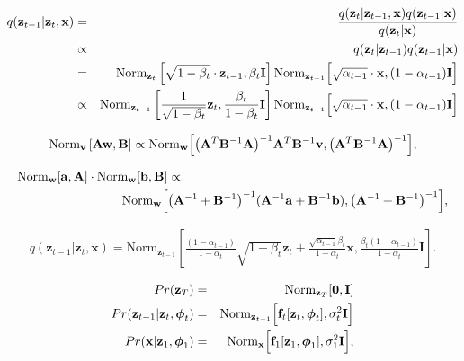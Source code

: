 \documentclass[letterpaper,twoside,openany, titlepage,oldfontcommands,titles,dvipsnames]{memoir}
\begin{document}
\begin{eqnarray}\label{eq:diffusion_bayes}
 q(\mathbf{z}_{t-1}|\mathbf{z}_{t},\mathbf{x}) & = & \frac{q(\mathbf{z}_{t}|\mathbf{z}_{t-1},\mathbf{x})q(\mathbf{z}_{t-1}|\mathbf{x})}{q(\mathbf{z}_{t}|\mathbf{x})} \\
 &\propto& q(\mathbf{z}_{t}|\mathbf{z}_{t-1})q(\mathbf{z}_{t-1}|\mathbf{x})\nonumber \\
 &=& \mbox{Norm}_{\mathbf{z}_{t}}\left[\sqrt{1-\beta_{t}}\cdot\mathbf{z}_{t-1},\beta_{t}\mathbf{I}\right]\mbox{Norm}_{\mathbf{z}_{t-1}}\Bigl[\sqrt{\alpha_{t-1}}\cdot\mathbf{x},(1-\alpha_{t-1})\mathbf{I}\Bigr]\nonumber \\
 &\propto& \mbox{Norm}_{\mathbf{z}_{t-1}}\left[\frac{1}{\sqrt{1-\beta_{t}}}\mathbf{z}_{t},\frac{\beta_{t}}{1-\beta_{t}}\mathbf{I}\right]\mbox{Norm}_{\mathbf{z}_{t-1}}\Bigl[\sqrt{\alpha_{t-1}}\cdot\mathbf{x},(1-\alpha_{t-1})\mathbf{I}\Bigr] \nonumber 
 \end{eqnarray}


\begin{eqnarray}\label{eq:diffusion_gaussian_identity1}
 \mbox{Norm}_{\mathbf{v}}\left[\mathbf{A}\mathbf{w},\mathbf{B}\right] \propto \mbox{Norm}_{\mathbf{w}}\Bigl[\bigl(\mathbf{A}^T\mathbf{B}^{-1}\mathbf{A}\bigr)^{-1}\mathbf{A}^T\mathbf{B}^{-1}\mathbf{v},\bigl(\mathbf{A}^T\mathbf{B}^{-1}\mathbf{A}\bigr)^{-1}\Bigr],
 \end{eqnarray}

\begin{eqnarray}\label{eq:diffusion_gaussian_identity2}
 \mbox{Norm}_{\mathbf{w}}[\mathbf{a},\mathbf{A}]\cdot\mbox{Norm}_{\mathbf{w}}[\mathbf{b},\mathbf{B}] &
 \propto &\\ 
 &&\hspace{-2cm} \mbox{Norm}_{\mathbf{w}}\Bigl[\bigl(\mathbf{A}^{-1}+\mathbf{B}^{-1}\bigr)^{-1}(\mathbf{A}^{-1}\mathbf{a}+\mathbf{B}^{-1}\mathbf{b}),\bigl(\mathbf{A}^{-1}+\mathbf{B}^{-1}\bigr)^{-1} \Bigr],\nonumber 
 \end{eqnarray}


\begin{eqnarray}\label{eq:diffusion_conditional_reverse}
 q(\mathbf{z}_{t-1}|\mathbf{z}_{t},\mathbf{x}) = \mbox{Norm}_{\mathbf{z}_{t-1}}\left[\frac{(1-\alpha_{t-1})}{1-\alpha_{t}}\sqrt{1-\beta_{t}}\mathbf{z}_{t}+\frac{\sqrt{\alpha_{t-1}}\beta_{t}}{1-\alpha_{t}}\mathbf{x},\frac{\beta_{t}(1-\alpha_{t-1})}{1-\alpha_{t}}\mathbf{I} \right].
 \end{eqnarray}

\begin{eqnarray}\label{eq:diffusion_decoder_prob}
 Pr(\mathbf{z}_{T})&=& \mbox{Norm}_{\mathbf{z}_{T}}[\mathbf{0},\mathbf{I}]\nonumber \\
 Pr(\mathbf{z}_{t-1}|\mathbf{z}_{t},\boldsymbol\phi_{t}) &=& \mbox{Norm}_{\mathbf{z}_{t-1}}\Bigl[\mbox{\bf f}_{t}[\mathbf{z}_{t},\boldsymbol\phi_{t}],\sigma_{t}^{2}\mathbf{I}\Bigr]\nonumber\\
 Pr(\mathbf{x}|\mathbf{z}_{1},\boldsymbol\phi_{1}) & =&\mbox{Norm}_{\mathbf{x}}\Bigl[\mbox{\bf f}_{1}[\mathbf{z}_{1},\boldsymbol\phi_{1}],\sigma^{2}_{1}\mathbf{I}\Bigr],
 \end{eqnarray}
\end{document}
